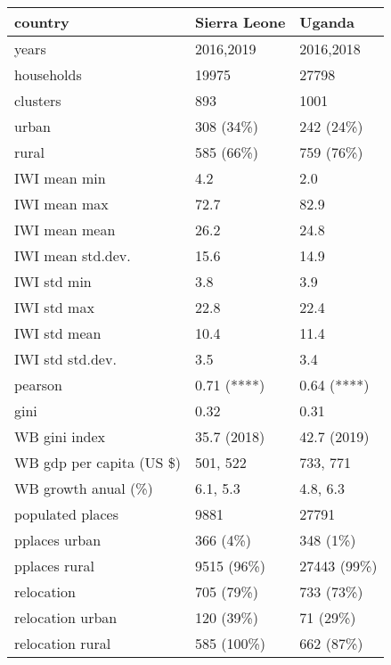 \begin{tabular}{lll}
\toprule
country & Sierra Leone &       Uganda \\
\midrule
years                    &    2016,2019 &    2016,2018 \\
households               &        19975 &        27798 \\
clusters                 &          893 &         1001 \\
urban                    &    308 (34\%) &    242 (24\%) \\
rural                    &    585 (66\%) &    759 (76\%) \\
IWI mean min             &          4.2 &          2.0 \\
IWI mean max             &         72.7 &         82.9 \\
IWI mean mean            &         26.2 &         24.8 \\
IWI mean std.dev.        &         15.6 &         14.9 \\
IWI std min              &          3.8 &          3.9 \\
IWI std max              &         22.8 &         22.4 \\
IWI std mean             &         10.4 &         11.4 \\
IWI std std.dev.         &          3.5 &          3.4 \\
pearson                  &  0.71 (****) &  0.64 (****) \\
gini                     &         0.32 &         0.31 \\
WB gini index            &  35.7 (2018) &  42.7 (2019) \\
WB gdp per capita (US \$) &     501, 522 &     733, 771 \\
WB growth anual (\%)      &     6.1, 5.3 &     4.8, 6.3 \\
populated places         &         9881 &        27791 \\
pplaces urban            &     366 (4\%) &     348 (1\%) \\
pplaces rural            &   9515 (96\%) &  27443 (99\%) \\
relocation               &    705 (79\%) &    733 (73\%) \\
relocation urban         &    120 (39\%) &     71 (29\%) \\
relocation rural         &   585 (100\%) &    662 (87\%) \\
\bottomrule
\end{tabular}
